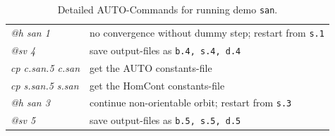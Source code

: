 \documentclass[12pt]{report}
\begin{document}
\begin{table}[htbp]
\begin{center}
\begin{tabular}{| l | l |}
  {\it @h san 1} & no convergence without dummy step; restart from {\tt s.1} \\ 
  {\it @sv 4} &  save output-files as {\tt b.4, s.4, d.4} \\ 
\hline
  {\it cp c.san.5 c.san} & get the AUTO constants-file \\ 
  {\it cp s.san.5 s.san} & get the HomCont constants-file \\
  {\it @h san 3} & continue non-orientable orbit; restart from {\tt s.3} \\
  {\it @sv 5} & save output-files as {\tt b.5, s.5, d.5} \\ 
\hline
\end{tabular}
\caption{Detailed {\cal AUTO}-Commands for running demo {\tt san}.}
\label{tbl:demo_san_1}
\end{center}
\end{table}
\end{document}

